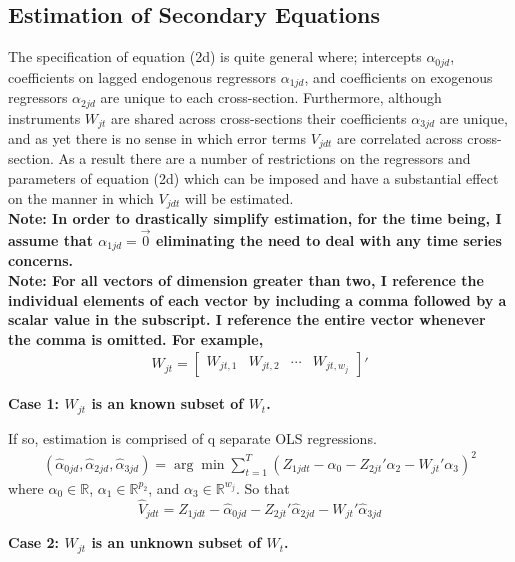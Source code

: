 \documentclass[10pt]{article}
\begin{document}
\subsection*{Estimation of Secondary Equations} 
The specification of equation (2d) is quite general where; intercepts $\alpha_{0jd}$, coefficients on lagged endogenous regressors $\alpha_{1jd}$, and coefficients on exogenous regressors $\alpha_{2jd}$ are unique to each cross-section. Furthermore, although instruments $W_{jt}$ are shared across cross-sections their coefficients $\alpha_{3jd}$ are unique, and as yet there is no sense in which error terms $V_{jdt}$ are correlated across cross-section. As a result there are a number of restrictions on the regressors and parameters of equation (2d) which can be imposed and have a substantial effect on the manner in which $V_{jdt}$ will be estimated. \\

\noindent \bf Note: \rm In order to drastically simplify estimation, for the time being, I assume that $\alpha_{1jd} = \vec{0}$ eliminating the need to deal with any time series concerns. \\

\noindent \bf Note: \rm For all vectors of dimension greater than two, I reference the individual elements of each vector by including a comma followed by a scalar value in the subscript. I reference the entire vector whenever the comma is omitted. For example,
\begin{align*} 
W_{jt} = \begin{bmatrix} W_{jt,1} & W_{jt,2} & \cdots & W_{jt,w_j} \end{bmatrix}'
\end{align*}

\noindent \bf Case 1: \rm $W_{jt}$ is an known subset of $W_{t}$.   \

\noindent If so, estimation is comprised of q separate OLS regressions.
\begin{align*} 
(\hat{\alpha}_{0jd}, \hat{\alpha}_{2jd},\hat{\alpha}_{3jd}) 
 = \arg \min \sum_{t=1}^T\left(Z_{1jdt} - \alpha_{0} -  Z_{2jt}'\alpha_{2} - W_{jt}'\alpha_{3} \right)^2
\end{align*}
where $\alpha_0 \in \mathbb{R}$, $\alpha_{1} \in \mathbb{R}^{p_2}$, and $\alpha_{3} \in \mathbb{R}^{w_j}$. So that 
$$\hat{V}_{jdt} = Z_{1jdt} - \hat{\alpha}_{0jd} - Z_{2jt}'\hat{\alpha}_{2jd} - W_{jt}'\hat{\alpha}_{3jd}$$

\noindent\bf Case 2: \rm $W_{jt}$ is an unknown subset of $W_{t}$. \
\end{document}
